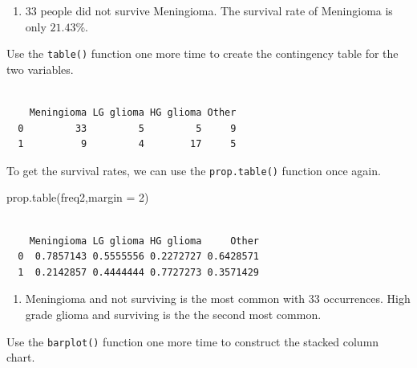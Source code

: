 \documentclass[
  letterpaper,
  DIV=11,
  numbers=noendperiod]{scrreprt}
\newenvironment{Shaded}{\begin{snugshade}}{\end{snugshade}}
\newcommand{\AttributeTok}[1]{\textcolor[rgb]{0.40,0.45,0.13}{#1}}
\newcommand{\DecValTok}[1]{\textcolor[rgb]{0.68,0.00,0.00}{#1}}
\newcommand{\FunctionTok}[1]{\textcolor[rgb]{0.28,0.35,0.67}{#1}}
\newcommand{\NormalTok}[1]{\textcolor[rgb]{0.00,0.23,0.31}{#1}}
\newcommand{\OtherTok}[1]{\textcolor[rgb]{0.00,0.23,0.31}{#1}}
\newcommand{\SpecialCharTok}[1]{\textcolor[rgb]{0.37,0.37,0.37}{#1}}
\providecommand{\tightlist}{%
  \setlength{\itemsep}{0pt}\setlength{\parskip}{0pt}}\usepackage{longtable,booktabs,array}
\begin{document}
\begin{enumerate}
\def\labelenumi{\arabic{enumi}.}
\setcounter{enumi}{2}
\tightlist
\item
  \(33\) people did not survive Meningioma. The survival rate of
  Meningioma is only \(21.43\)\%.
\end{enumerate}

Use the \texttt{table()} function one more time to create the
contingency table for the two variables.

\begin{Shaded}
\end{Shaded}

\begin{verbatim}
   
    Meningioma LG glioma HG glioma Other
  0         33         5         5     9
  1          9         4        17     5
\end{verbatim}

To get the survival rates, we can use the \texttt{prop.table()} function
once again.

\begin{Shaded}
\begin{Highlighting}[numbers=left,,]
\FunctionTok{prop.table}\NormalTok{(freq2,}\AttributeTok{margin =} \DecValTok{2}\NormalTok{)}
\end{Highlighting}
\end{Shaded}

\begin{verbatim}
   
    Meningioma LG glioma HG glioma     Other
  0  0.7857143 0.5555556 0.2272727 0.6428571
  1  0.2142857 0.4444444 0.7727273 0.3571429
\end{verbatim}

\begin{enumerate}
\def\labelenumi{\arabic{enumi}.}
\setcounter{enumi}{3}
\tightlist
\item
  Meningioma and not surviving is the most common with \(33\)
  occurrences. High grade glioma and surviving is the the second most
  common.
\end{enumerate}

Use the \texttt{barplot()} function one more time to construct the
stacked column chart.
\end{document}

